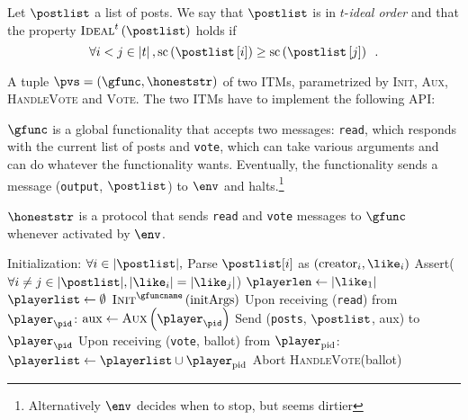     \begin{definition}
      Let $\postlist$ a list of posts. We say that $\postlist$ is in
      $t$-\emph{ideal order} and that the property
      $\textsc{Ideal}^{t}\left(\postlist\right)$ holds if
      \begin{equation*}
        \forall i < j \in \left|t\right|,
        \mathrm{sc}\left(\postlist\left[i\right]\right) \geq
        \mathrm{sc}\left(\postlist\left[j\right]\right) \enspace.
      \end{equation*}
    \end{definition}

    \begin{definition}
      A tuple $\pvs = \left(\gfunc, \honeststr\right)$ of two ITMs, parametrized
      by \textsc{Init}, \textsc{Aux}, \textsc{HandleVote} and \textsc{Vote}. The
      two ITMs have to implement the following API:

      $\gfunc$ is a global functionality that accepts two messages:
      \texttt{read}, which responds with the current list of posts and
      \texttt{vote}, which can take various arguments and can do whatever the
      functionality wants. Eventually, the functionality sends a message
      (\texttt{output}, $\postlist$) to $\env$ and halts.\footnote{Alternatively
      $\env$ decides when to stop, but seems dirtier}

      $\honeststr$ is a protocol that sends \texttt{read} and \texttt{vote}
      messages to $\gfunc$ whenever activated by $\env$.
    \end{definition}

    \begin{algorithm}[H]
      \caption{$\gfunc\left(\textsc{Init}^{\gfuncname}, \textsc{Aux},
      \textsc{HandleVote}\right)\left(\postlist, \mathrm{initArgs}\right)$}
      \label{alg:gfunc}
      \begin{algorithmic}[1]
        \State Initialization:
        \Indent
          \State $\forall i \in |\postlist|,$ Parse $\postlist[i]$ as
          $\left(\mathrm{creator}_i, \like_i\right)$
          \State Assert($\forall i \neq j \in |\postlist|, |\like_i| =
          |\like_j|$)
          \State $\playerlen \gets |\like_1|$
          \State $\playerlist \gets \emptyset$
          \State $\textsc{Init}^{\gfuncname}\left(\mathrm{initArgs}\right)$
        \EndIndent
        \State
        \State Upon receiving (\texttt{read}) from $\player_{\pid}$:
        \Indent
          \State $\mathrm{aux} \gets \textsc{Aux}\left(\player_{\pid}\right)$
          \State Send (\texttt{posts}, $\postlist$, aux) to $\player_{\pid}$
        \EndIndent
        \State
        \State Upon receiving (\texttt{vote}, ballot) from
        $\player_{\mathrm{pid}}$:
         \Indent
           \State $\playerlist \gets \playerlist \cup \player_{\mathrm{pid}}$
           \If{$|\playerlist| > \playerlen$}
             \State Abort
           \EndIf
           \State \textsc{HandleVote}(ballot)
         \EndIndent
      \end{algorithmic}
    \end{algorithm}

